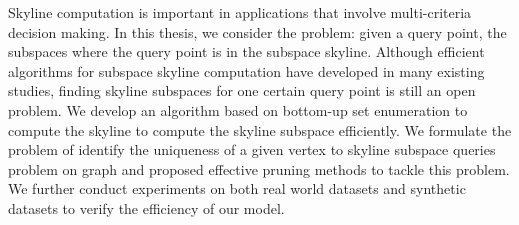 
%
%


Skyline computation is important in applications that involve multi-criteria decision making. In this thesis, we consider the problem: given a query point, the subspaces where the query point is in the subspace skyline. Although efficient algorithms for subspace skyline computation have developed in many existing studies, finding skyline subspaces for one certain query point is still an open problem. We develop an algorithm based on bottom-up set enumeration to compute the skyline to compute the skyline subspace efficiently. We formulate the problem of identify the uniqueness of a given vertex to skyline subspace queries problem on graph and proposed effective pruning methods to tackle this problem. We further conduct experiments on both real world datasets and synthetic datasets to verify the efficiency of our model.
